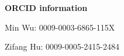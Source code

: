 \documentclass[10pt,a4paper]{article}
\begin{document}
{\large\bfseries ORCID information}\par

Min Wu: 0009-0003-6865-115X

Zifang Hu: 0009-0005-2415-2484
\end{document}
